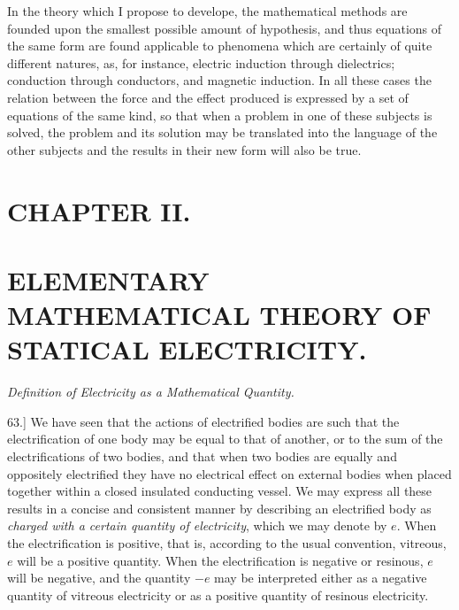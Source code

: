 \documentclass[11pt,a4paper]{article}
\begin{document}
In the theory which I propose to develope, the mathematical methods
are founded upon the smallest possible amount of hypothesis, and thus
equations of the same form are found applicable to phenomena which are
certainly of quite different natures, as, for instance, electric induction
through dielectrics; conduction through conductors, and magnetic
induction. In all these cases the relation between the force and the
effect produced is expressed by a set of equations of the same kind,
so that when a problem in one of these subjects is solved, the problem
and its solution may be translated into the language of the other
subjects and the results in their new form will also be true.

\clearpage
\setcounter{footnote}{0}

\section*{CHAPTER II.}

\section*{ELEMENTARY MATHEMATICAL THEORY OF STATICAL ELECTRICITY.}

\begin{center}
\textit{Definition of Electricity as a Mathematical Quantity.}
\end{center}

63.] We have seen that the actions of electrified bodies are such that
the electrification of one body may be equal to that of another, or to
the sum of the electrifications of two bodies, and that when two bodies
are equally and oppositely electrified they have no electrical effect on
external bodies when placed together within a closed insulated conducting
vessel. We may express all these results in a concise and consistent
manner by describing an electrified body as \textit{charged with a certain
quantity of electricity}, which we may denote by \(e\). When the
electrification is positive, that is, according to the usual convention,
vitreous, \(e\) will be a positive quantity. When the electrification
is negative or resinous, \(e\) will be negative, and the quantity \(-e\)
may be interpreted either as a negative quantity of vitreous electricity
or as a positive quantity of resinous electricity.
\end{document}
